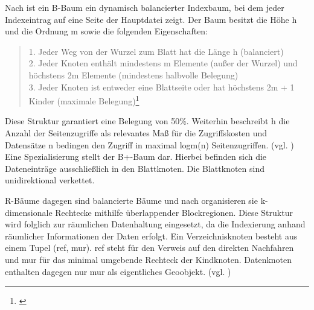 Nach \cite[S.288]{book:kudrass} ist ein B-Baum ein dynamisch balancierter Indexbaum, bei dem jeder Indexeintrag auf eine Seite der Hauptdatei zeigt.
Der Baum besitzt die Höhe h und die Ordnung m sowie die folgenden Eigenschaften:
\begin{quote}
1. Jeder Weg von der Wurzel zum Blatt hat die Länge h (balanciert)\\
2. Jeder Knoten enthält mindestens m Elemente (außer der Wurzel) und  höchstens 2m Elemente (mindestens halbvolle Belegung)\\
3. Jeder Knoten ist entweder eine Blattseite oder hat höchstens 2m + 1 Kinder (maximale Belegung)\footnote{\cite[S.284]{book:kudrass}}
\end{quote}
Diese Struktur garantiert eine Belegung von 50\%.
Weiterhin beschreibt h die Anzahl der Seitenzugriffe als relevantes Maß für die Zugriffskosten und Datensätze n bedingen den Zugriff in maximal logm(n) Seitenzugriffen. (vgl. \cite[S.288]{book:kudrass})
Eine Spezialisierung stellt der B+-Baum dar.
Hierbei befinden sich die Dateneinträge ausschließlich in den Blattknoten.
Die Blattknoten sind unidirektional verkettet.
%

R-Bäume dagegen sind balancierte Bäume und nach \cite[S. 523]{book:kudrass} organisieren sie k-dimensionale Rechtecke mithilfe überlappender Blockregionen.
Diese Struktur wird folglich zur räumlichen Datenhaltung eingesetzt, da die Indexierung anhand räumlicher Informationen der Daten erfolgt.
Ein Verzeichnisknoten besteht aus einem Tupel (ref, mur).
ref steht für den Verweis auf den direkten Nachfahren und mur für das minimal umgebende Rechteck der Kindknoten.
Datenknoten enthalten dagegen nur mur als eigentliches Geoobjekt. (vgl. \cite[S.523 ff.]{book:kudrass})


